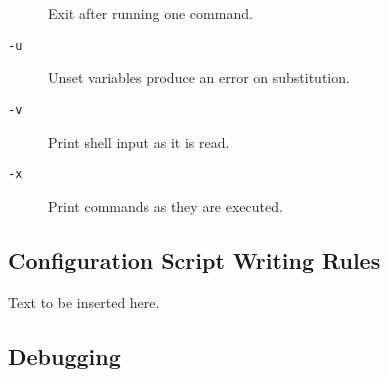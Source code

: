 \begin{description}
Exit after running one command. 

\item[{\tt -u}] \mbox{}

Unset variables produce an error on 
substitution. 

\item[{\tt -v}] \mbox{}

Print shell input as it is read. 

\item[{\tt -x}] \mbox{}

Print commands as they are executed. 

\end{description}





\subsection{Configuration Script Writing Rules}

Text to be inserted here.




\subsection{Debugging}



